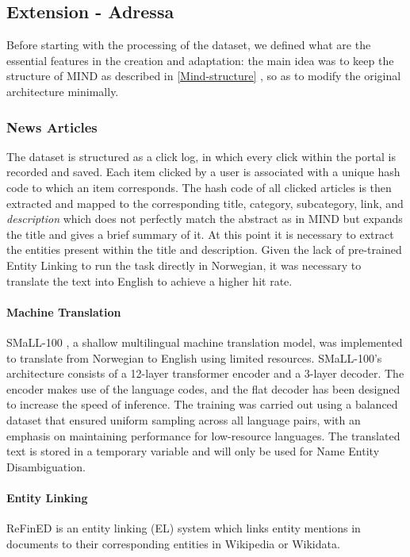 \documentclass[conference]{IEEEtran}
\begin{document}
\subsection{Extension - Adressa}
Before starting with the processing of the dataset, we defined what are the essential features in the creation and adaptation: the main idea was to keep the structure of MIND as described in \ref{Mind-structure} , so as to modify the original architecture minimally.\\
\subsubsection{News Articles} The dataset is structured as a click log, in which every click within the portal is recorded and saved. Each item clicked by a user is associated with a unique hash code to which an item corresponds.
The hash code of all clicked articles is then extracted and mapped to the corresponding title, category, subcategory, link, and \textit{description} which does not perfectly match the abstract as in MIND but expands the title and gives a brief summary of it.
At this point it is necessary to extract the entities present within the title and description.
Given the lack of pre-trained Entity Linking to run the task directly in Norwegian, it was necessary to translate the text into English to achieve a higher hit rate.
\paragraph{Machine Translation} SMaLL-100\cite{mohammadshahi-etal-2022-small} \cite{mohammadshahi-etal-2022-small}, a shallow multilingual machine translation model, was implemented to translate from Norwegian to English using limited resources. SMaLL-100's architecture consists of a 12-layer transformer encoder and a 3-layer decoder. The encoder makes use of the language codes, and the flat decoder has been designed to increase the speed of inference. The training was carried out using a balanced dataset that ensured uniform sampling across all language pairs, with an emphasis on maintaining performance for low-resource languages.
The translated text is stored in a temporary variable and will only be used for Name Entity Disambiguation.
\paragraph{Entity Linking} ReFinED is an entity linking (EL) system which links entity mentions in documents to their corresponding entities in Wikipedia or Wikidata.
\end{document}
